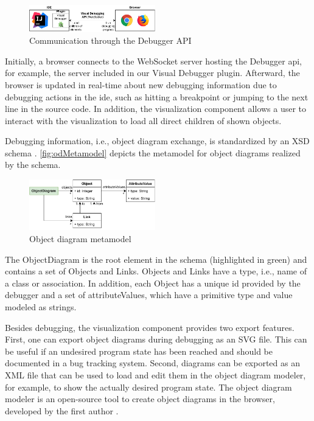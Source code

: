 \documentclass[conference]{IEEEtran}
\begin{document}
\begin{figure}[h]
    \centering
    \includegraphics[width=0.488\textwidth]{images/VD-architecture.pdf}
    \caption{Communication through the Debugger API}
    \label{fig:api}
\end{figure}

Initially, a browser connects to the WebSocket server hosting the Debugger \gls*{api}, for example, the server included in our Visual Debugger plugin.
Afterward, the browser is updated in real-time about new debugging information due to debugging actions in the \gls*{ide}, such as hitting a breakpoint or jumping to the next line in the source code.
In addition, the visualization component allows a user to interact with the visualization to load all direct children of shown objects.

Debugging information, i.e., object diagram exchange, is standardized by an XSD schema \cite{ArtifactsICSME2022}.
\autoref{fig:odMetamodel} depicts the metamodel for object diagrams realized by the schema.

\begin{figure}[h]
    \centering
    \includegraphics[width=0.488\textwidth]{images/VD-metamodel.pdf}
    \caption{Object diagram metamodel}
    \label{fig:odMetamodel}
\end{figure}

The \textsf{ObjectDiagram} is the root element in the schema (highlighted in green) and contains a set of \textsf{Objects} and \textsf{Links}.
\textsf{Objects} and \textsf{Links} have a \textsf{type}, i.e., name of a class or association.
In addition, each \textsf{Object} has a unique id provided by the debugger and a set of \textsf{attributeValues}, which have a primitive \textsf{type} and \textsf{value} modeled as strings.

Besides debugging, the visualization component provides two export features.
First, one can export object diagrams during debugging as an SVG file.
This can be useful if an undesired program state has been reached and should be documented in a bug tracking system.
Second, diagrams can be exported as an XML file that can be used to load and edit them in the object diagram modeler, for example, to show the actually desired program state.
The object diagram modeler is an open-source tool to create object diagrams in the browser, developed by the first author \cite{ObjectDiagramModeler2022}.
\end{document}

